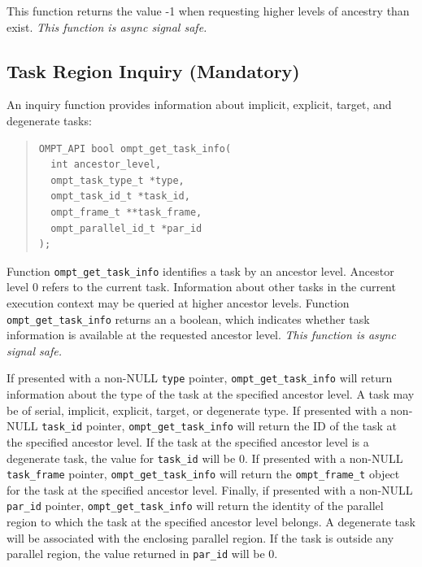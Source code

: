 \documentclass{article}
\begin{document}
\noindent
 This function returns the value -1 when requesting higher levels of
 ancestry than exist.  {\em This function is async signal safe.}


 
\subsection{Task Region Inquiry (Mandatory)}
\label{sec:task-region}

An inquiry function provides information about implicit, explicit, target, and degenerate tasks:

\begin{quote}
\begin{verbatim}
OMPT_API bool ompt_get_task_info(
  int ancestor_level,
  ompt_task_type_t *type,
  ompt_task_id_t *task_id,
  ompt_frame_t **task_frame,
  ompt_parallel_id_t *par_id
);
\end{verbatim}
\end{quote}

Function \verb|ompt_get_task_info|  identifies a task by an ancestor level. 
Ancestor level 0 refers to the current task. 
Information about other tasks in the current execution context may be queried at higher ancestor levels. 
Function \verb|ompt_get_task_info| returns an a boolean, which indicates whether task information is available at the requested ancestor level.
{\em This function is async signal safe.} 

If presented with a non-NULL \verb|type| pointer, \verb|ompt_get_task_info| will return information about the type of the task at the specified ancestor level. A task may be of  serial, implicit, explicit,  target, or degenerate type. If presented with a non-NULL \verb|task_id| pointer, \verb|ompt_get_task_info| will return the ID of the task at the specified ancestor level. If the task at the specified ancestor level is a degenerate task, the value for \verb|task_id| will be 0. If presented with a non-NULL \verb|task_frame| pointer, \verb|ompt_get_task_info| will return the \verb|ompt_frame_t| object for the task at the specified ancestor level. Finally, if presented with a non-NULL \verb|par_id| pointer, \verb|ompt_get_task_info| will return the identity of the parallel region to which the task at the specified ancestor level belongs. A degenerate task will be associated with the enclosing parallel region. 
If the task is outside any parallel region, the value returned in \verb|par_id| will be 0.

\end{document}
